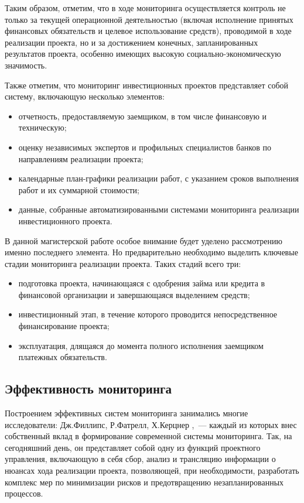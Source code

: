 \documentclass[12pt,a4paper]{article} %
\begin{document}
Таким образом, отметим, что в ходе мониторинга осуществляется контроль не только за текущей операционной деятельностью (включая исполнение принятых финансовых обязательств и целевое использование средств), проводимой в ходе реализации проекта, но и за достижением конечных, запланированных результатов проекта, особенно имеющих высокую социально-экономическую значимость.

Также отметим, что мониторинг инвестиционных проектов представляет собой систему, включающую несколько элементов\cite{Antonov2014}:

\begin{itemize}
	\item отчетность, предоставляемую заемщиком, в том числе финансовую и техническую;
	\item оценку независимых экспертов и профильных специалистов банков по направлениям реализации проекта;
	\item календарные план-графики реализации работ, с указанием сроков выполнения работ и их суммарной стоимости;
	\item данные, собранные автоматизированными системами мониторинга реализации инвестиционного проекта.
\end{itemize}

В данной магистерской работе особое внимание будет уделено рассмотрению именно последнего элемента. Но предварительно необходимо выделить ключевые стадии мониторинга реализации проекта. Таких стадий всего три:
\begin{itemize}
	\item 	подготовка проекта, начинающаяся с одобрения займа или кредита в финансовой организации и завершающаяся выделением средств;
	\item 	инвестиционный этап, в течение которого проводится непосредственное финансирование проекта;
	\item 	эксплуатация, длящаяся до момента полного исполнения заемщиком платежных обязательств.
\end{itemize}

\subsection{Эффективность мониторинга}

Построением эффективных систем мониторинга занимались многие исследователи: Дж.Филлипс, Р.Фатрелл, Х.Керцнер \cite{Filli, Fatrell, Hastie},~--- каждый из которых внес собственный вклад в формирование современной системы мониторинга. Так, на сегодняшний день, он представляет собой одну из функций проектного управления, включающую в себя сбор, анализ и трансляцию информации о нюансах хода реализации проекта, позволяющей, при необходимости, разработать комплекс мер по минимизации рисков и предотвращению незапланированных процессов.
\end{document}
